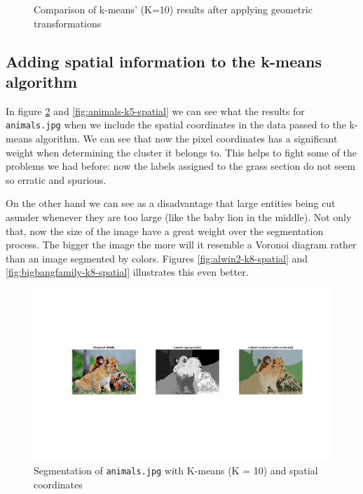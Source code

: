 \begin{figure}[hbt]
	\caption{Comparison of k-means' (K=10) results after applying geometric transformations}
	\label{fig:kmeans-geometric-transformations}
\end{figure}

\subsection{Adding spatial information to the k-means algorithm}

In figure \ref{fig:animals-k10-spatial} and \ref{fig:animals-k5-spatial} we can
see what the results for \texttt{animals.jpg} when we include the spatial coordinates in
the data passed to the k-means algorithm. We can see that now the pixel
coordinates has a significant weight when determining the cluster it belongs to. This helps
to fight some of the problems we had before: now the labels assigned to the grass section
do not seem so erratic and spurious.

On the other hand we can see as a disadvantage that
large entities being cut asunder whenever they are too large (like the baby lion
in the middle). Not only that, now the size of the image have a great weight over the
segmentation process. The bigger the image the more will it resemble a Voronoi diagram
rather than an image segmented by colors. Figures \ref{fig:alwin2-k8-spatial}
and \ref{fig:bigbangfamily-k8-spatial} illustrates this even better.

\begin{figure}[hbt]
\centering
\includegraphics[trim={50px 250px 50px 225px},clip,width=\textwidth]{img/kmeans/animals_k10_spatial.png}
\caption{Segmentation of \texttt{animals.jpg} with K-means (K = 10) and spatial coordinates}
\label{fig:animals-k10-spatial}
\end{figure}

